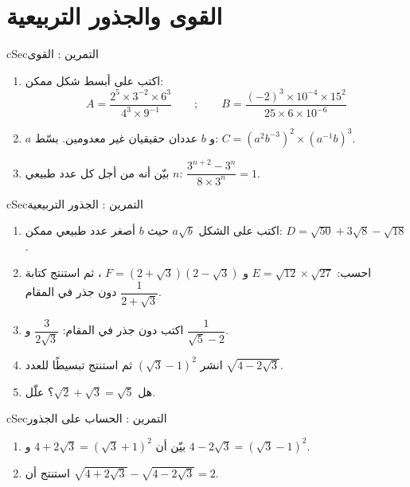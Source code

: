 \documentclass[12pt,a4paper]{article}
\newenvironment{BOX}[2]{\begin{otherlanguage}{english}\begin{arbox}{#1}{#2}}{\end{arbox}\end{otherlanguage}}
\newcounter{exo}
\newenvironment{tamrin}[1]{\stepcounter{exo}\begin{BOX}{cSec}{التمرين \theexo: #1}}{\end{BOX}}
\begin{document}
\section{القوى والجذور التربيعية}
\begin{tamrin}{القوى}
\begin{enumerate}
\item اكتب على أبسط شكل ممكن:
\[A=\frac{2^5\times3^{-2}\times6^3}{4^3\times9^{-1}}\qquad;\qquad B=\frac{(-2)^3\times10^{-4}\times15^2}{25\times6\times10^{-6}}\]
\item $a$ و $b$ عددان حقيقيان غير معدومين. بسّط: $C=\left(a^2b^{-3}\right)^2\times\left(a^{-1}b\right)^3$.
\item بيّن أنه من أجل كل عدد طبيعي $n$: $\dfrac{3^{n+2}-3^n}{8\times3^n}=1$.
\end{enumerate}
\end{tamrin}

\begin{tamrin}{الجذور التربيعية}
\begin{enumerate}
\item اكتب على الشكل $a\sqrt b$ حيث $b$ أصغر عدد طبيعي ممكن: $D=\sqrt{50}+3\sqrt8-\sqrt{18}$.
\item احسب: $E=\sqrt{12}\times\sqrt{27}$ و $F=\left(2+\sqrt3\right)\left(2-\sqrt3\right)$ ، ثم استنتج كتابة $\dfrac1{2+\sqrt3}$ دون جذر في المقام.
\item اكتب دون جذر في المقام: $\dfrac3{2\sqrt3}$ و $\dfrac1{\sqrt5-2}$.
\item انشر $\left(\sqrt3-1\right)^2$ ثم استنتج تبسيطًا للعدد $\sqrt{4-2\sqrt3}$.
\item هل $\sqrt2+\sqrt3=\sqrt5$؟ علّل.
\end{enumerate}
\end{tamrin}

\begin{tamrin}{الحساب على الجذور}
\begin{enumerate}
\item بيّن أن $4+2\sqrt3=\left(\sqrt3+1\right)^2$ و $4-2\sqrt3=\left(\sqrt3-1\right)^2$.
\item استنتج أن $\sqrt{4+2\sqrt3}-\sqrt{4-2\sqrt3}=2$.
\end{enumerate}
\end{tamrin}

\end{document}

